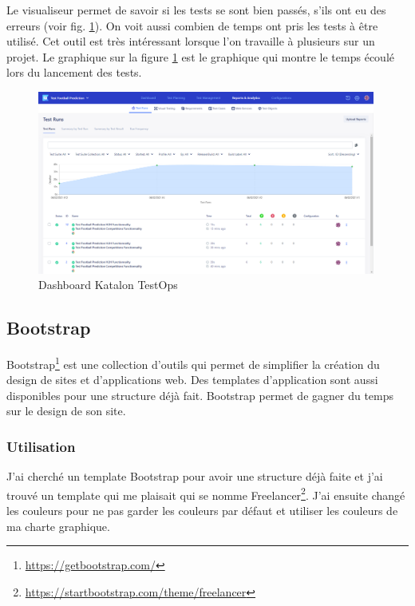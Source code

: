 \documentclass[a4paper,14pt]{extarticle}
\begin{document}
{Le visualiseur permet de savoir si les tests se sont bien passés, s'ils ont eu des erreurs (voir fig. \ref{fig:dashboardTestOps}). On voit aussi combien de temps ont pris les tests à être utilisé. Cet outil est très intéressant lorsque l'on travaille à plusieurs sur un projet.
Le graphique sur la figure \ref{fig:dashboardTestOps} est le graphique qui montre le temps écoulé lors du lancement des tests.

\begin{figure}[htp]
    \centering
    \includegraphics[width=30em]{../img/dashboardTestOps.png}
    \caption{Dashboard Katalon TestOps}
    \label{fig:dashboardTestOps}
\end{figure}

\newpage

\subsection{Bootstrap}

Bootstrap\footnote{\url{https://getbootstrap.com/}} est une collection d'outils qui permet de simplifier la création du design de sites et d'applications web. Des templates d'application sont aussi disponibles pour une structure déjà fait. Bootstrap permet de gagner du temps sur le design de son site.

\subsubsection{Utilisation}

J'ai cherché un template Bootstrap pour avoir une structure déjà faite et j'ai trouvé un template qui me plaisait qui se nomme Freelancer\footnote{\url{https://startbootstrap.com/theme/freelancer}}. J'ai ensuite changé les couleurs pour ne pas garder les couleurs par défaut et utiliser les couleurs de ma charte graphique. 

\newpage

}
\end{document}
